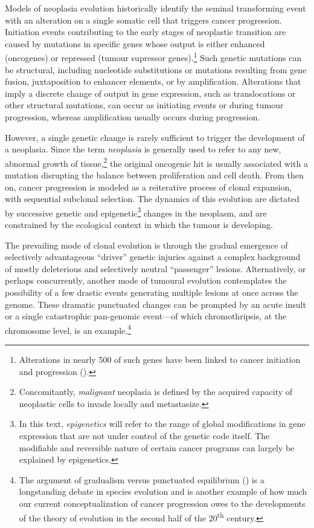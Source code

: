 Models of neoplasia evolution historically identify the seminal transforming
event with an alteration on a single somatic cell that triggers cancer
progression.  Initiation events contributing to the early stages of neoplastic
transition are caused by mutations in specific genes whose output is either
enhanced (oncogenes) or repressed (tumour supressor genes).\footnote{Alterations
  in nearly 500 of such genes have been linked to cancer initiation and
  progression (\citealp{forbes_catalogue_2008}).}  Such genetic mutations can be
structural, including nucleotide substitutions or mutations resulting from gene
fusion,\cite{konopka_cell_1985} juxtaposition to enhancer
elements,\cite{tsujimoto_t14;18_1985} or by amplification.  Alterations that
imply a discrete change of output in gene expression, such as translocations or
other structural mutations, can occur as initiating
events\cite{finger_common_1986} or during tumour progression, whereas
amplification usually occurs during progression.\cite{croce_oncogenes_2008}

However, a single genetic change is rarely sufficient to trigger the development
of a neoplasia.  Since the term \emph{neoplasia} is generally used to refer to
any new, abnormal growth of tissue,\footnote{Concomitantly, \emph{malignant}
  neoplasia is defined by the acquired capacity of neoplastic cells to invade
  locally and metastasize.} the original oncogenic hit is usually associated
with a mutation disrupting the balance between proliferation and cell death.
From then on, cancer progression is modeled as a reiterative process of clonal
expansion, with sequential subclonal
selection.\cite{nowell_clonal_1976,greaves_clonal_2012} The dynamics of this
evolution are dictated by successive genetic and epigenetic\footnote{In this
  text, \emph{epigenetics} will refer to the range of global modifications in
  gene expression that are not under control of the genetic code itself.  The
  modifiable and reversible nature of certain cancer programs can largely be
  explained by epigenetics.} changes in the neoplasm, and are constrained by the
ecological context in which the tumour is developing.

The prevailing mode of clonal evolution is through the gradual emergence of
selectively advantageous ``driver'' genetic injuries against a complex
background of mostly deleterious and selectively neutral ``passenger'' lesions.
Alternatively, or perhaps concurrently, another mode of tumoural evolution
contemplates the possibility of a few drastic events generating multiple lesions
at once across the genome.  These dramatic punctuated changes can be prompted by
an acute insult or a single catastrophic pan-genomic event---of which
chromothripsis, at the chromosome level, is an
example.\cite{stephens_massive_2011}\footnote{The argument of gradualism versus
  punctuated equilibrium (\citealp{gould_punctuated_1993}) is a longstanding
  debate in species evolution and is another example of how much our current
  conceptualization of cancer progression owes to the developments of the theory
  of evolution in the second half of the 20\textsuperscript{th} century.}

